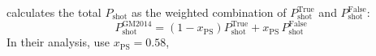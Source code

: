                                                                                                                                                                                                                                                                          \cite{Gil-Marin:2014aa} calculates the total $P_\mathrm{shot}$ as the 
                                                                                                                                                                                                                                                                         weighted combination of $P^\mathrm{True}_\mathrm{shot}$ and
                                                                                                                                                                                                                                                                         $P^\mathrm{False}_\mathrm{shot}$: 
                                                                                                                                                                                                                                                                         \begin{equation} \label{eq:gm_shot}
                                                                                                                                                                                                                                                                         P^\mathrm{GM2014}_\mathrm{shot} = (1- x_\mathrm{PS}) P^\mathrm{True}_\mathrm{shot} +
                                                                                                                                                                                                                                                                         x_\mathrm{PS}\, P^\mathrm{False}_\mathrm{shot}
                                                                                                                                                                                                                                                                         \end{equation}
                                                                                                                                                                                                                                                                         In their analysis, \cite{Gil-Marin:2014aa} use $x_\mathrm{PS} = 0.58$, 

